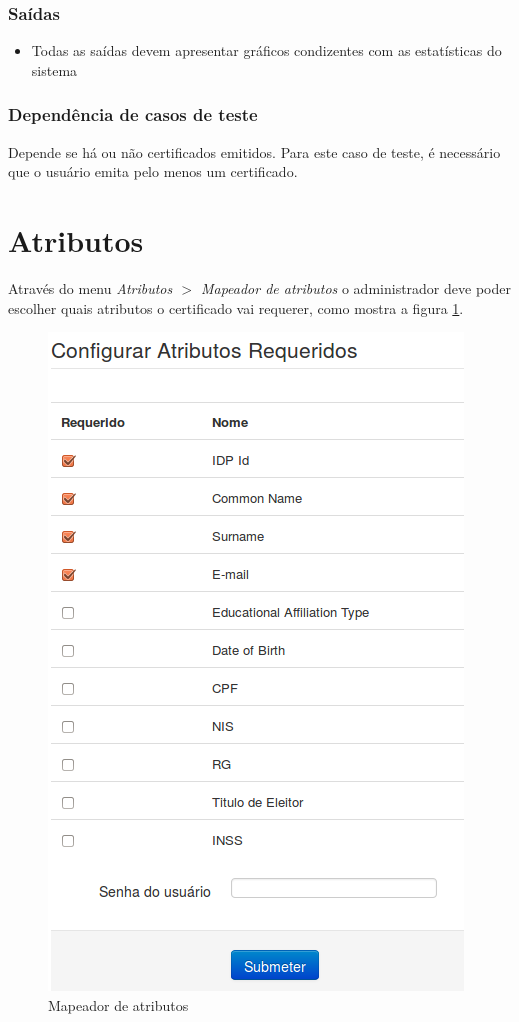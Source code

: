 \subsubsection{Saídas}

\begin{itemize}

	\item Todas as saídas devem apresentar gráficos condizentes com as estatísticas do sistema
	
\end{itemize}

\subsubsection{Dependência de casos de teste}
Depende se há ou não certificados emitidos. Para este caso de teste, é necessário que o usuário emita pelo menos um certificado.

\section{Atributos}

Através do menu \textit{Atributos $>$ Mapeador de atributos} o administrador deve poder escolher quais atributos o certificado vai requerer, como mostra a figura \ref{fig:atmap}.

\begin{figure}[ht]
     \centering
     \includegraphics[scale=0.6]{images/attributesmapper.png}
     \caption{Mapeador de atributos}
     \label{fig:atmap}
\end{figure}

